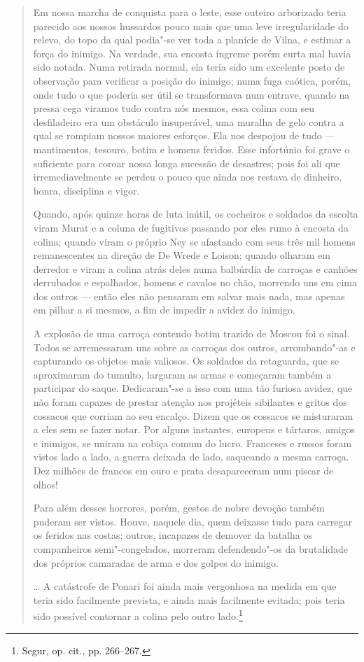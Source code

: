 \begin{quote}
Em nossa marcha de conquista para o leste, esse outeiro arborizado teria
parecido aos nossos hussardos pouco mais que uma leve irregularidade do
relevo, do topo da qual podia"-se ver toda a planície de Vilna, e estimar
a força do inimigo. Na verdade, sua encosta íngreme porém curta mal
havia sido notada. Numa retirada normal, ela teria sido um excelente
posto de observação para verificar a posição do inimigo; numa fuga
caótica, porém, onde tudo o que poderia ser útil se transformava num
entrave, quando na pressa cega viramos tudo contra nós mesmos, essa
colina com seu desfiladeiro era um obstáculo insuperável, uma muralha de
gelo contra a qual se rompiam nossos maiores esforços. Ela nos despojou
de tudo --- mantimentos, tesouro, botim e homens feridos. Esse infortúnio
foi grave o suficiente para coroar nossa longa sucessão de desastres;
pois foi ali que irremediavelmente se perdeu o pouco que ainda nos
restava de dinheiro, honra, disciplina e vigor.

Quando, após quinze horas de luta inútil, os cocheiros e soldados da
escolta viram Murat e a coluna de fugitivos passando por eles rumo à
encosta da colina; quando viram o próprio Ney se afastando com seus três
mil homens remanescentes na direção de De Wrede e Loison; quando olharam
em derredor e viram a colina atrás deles numa balbúrdia de carroças e
canhões derrubados e espalhados, homens e cavalos no chão, morrendo uns
em cima dos outros --- então eles não pensaram em salvar mais nada, mas
apenas em pilhar a si mesmos, a fim de impedir a avidez do inimigo.

A explosão de uma carroça contendo botim trazido de Moscou foi o sinal.
Todos se arremessaram uns sobre as carroças dos outros, arrombando"-as e
capturando os objetos mais valiosos. Os soldados da retaguarda, que se
aproximaram do tumulto, largaram as armas e começaram também a
participar do saque. Dedicaram"-se a isso com uma tão furiosa avidez, que
não foram capazes de prestar atenção nos projéteis sibilantes e gritos
dos cossacos que corriam ao seu encalço. Dizem que os cossacos se
misturaram a eles sem se fazer notar. Por alguns instantes, europeus e
tártaros, amigos e inimigos, se uniram na cobiça comum do lucro.
Franceses e russos foram vistos lado a lado, a guerra deixada de lado,
saqueando a mesma carroça. Dez milhões de francos em ouro e prata
desapareceram num piscar de olhos!

Para além desses horrores, porém, gestos de nobre devoção também puderam
ser vistos. Houve, naquele dia, quem deixasse tudo para carregar os
feridos nas costas; outros, incapazes de demover da batalha os
companheiros semi"-congelados, morreram defendendo"-os da brutalidade dos
próprios camaradas de arma e dos golpes do inimigo.

\ldots{} A catástrofe de Ponari foi ainda mais vergonhosa na medida em
que teria sido facilmente prevista, e ainda mais facilmente evitada;
pois teria sido possível contornar a colina pelo outro lado.\footnote{Segur,
  op. cit., pp. 266--267.}
\end{quote}

